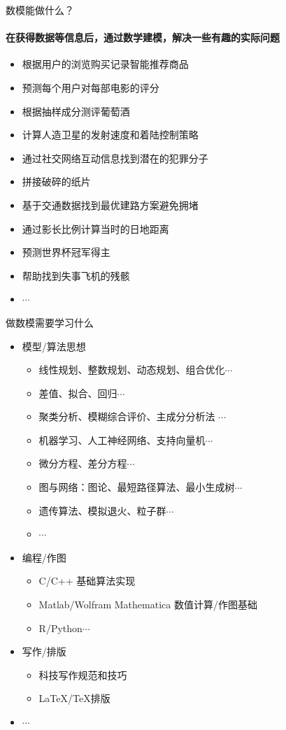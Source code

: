 \documentclass{beamer}
\begin{document}
\begin{frame}{数模能做什么？}
	\framesubtitle{在获得数据等信息后，通过数学建模，解决一些有趣的实际问题}
	\begin{itemize}
		\item 根据用户的浏览购买记录智能推荐商品
		\item 预测每个用户对每部电影的评分
		\item 根据抽样成分测评葡萄酒
		\item 计算人造卫星的发射速度和着陆控制策略
		\item 通过社交网络互动信息找到潜在的犯罪分子
		\item 拼接破碎的纸片
		\item 基于交通数据找到最优建路方案避免拥堵
		\item 通过影长比例计算当时的日地距离
		\item 预测世界杯冠军得主
		\item 帮助找到失事飞机的残骸
		\item $ \cdots $
	\end{itemize}
	
\end{frame}

\begin{frame}{做数模需要学习什么}\label{content}
	\begin{itemize}
	\item 模型/算法思想 
	
	\begin{itemize}
		\item 线性规划、整数规划、动态规划、组合优化$\cdots$
		\item 差值、拟合、回归$\cdots$
		\item 聚类分析、模糊综合评价、主成分分析法 $\cdots$
		\item 机器学习、人工神经网络、支持向量机$\cdots$
		\item 微分方程、差分方程$\cdots$
		\item 图与网络：图论、最短路径算法、最小生成树$\cdots$
		\item 遗传算法、模拟退火、粒子群$\cdots$
		\item $\cdots$
	\end{itemize}
	
	\item 编程/作图
	\begin{itemize}
		\item C/C++ 基础算法实现
		\item Matlab/Wolfram Mathematica 数值计算/作图基础
		\item R/Python$\cdots$
	\end{itemize}
	
	\item 写作/排版
	\begin{itemize}
		\item 科技写作规范和技巧
		\item  \LaTeX/\TeX 排版
	\end{itemize}
	\item $\cdots$
	\end{itemize}
	
\end{frame}
\end{document}
